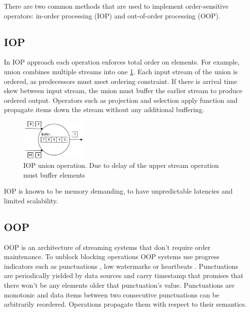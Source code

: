
\label {fs-typical}

There are two common methods that are used to implement order-sensitive operators: in-order processing (IOP) \cite{Arasu:2006:CCQ:1146461.1146463} \cite{Cranor:2003:GSD:872757.872838} \cite{hammad2004optimizing} and out-of-order processing (OOP)\cite{Li:2008:OPN:1453856.1453890}.

\subsection{IOP}

In IOP approach each operation enforces total order on elements. For example, union combines multiple streams into one \ref{iop}. Each input stream of the union is ordered, as predecessors must meet ordering constraint. If there is arrival time skew between input stream, the union must buffer the earlier stream to produce ordered output. Operators such as projection and selection apply function and propagate items down the stream without any additional buffering.

\begin{figure}[htbp]
  \centering
  \includegraphics[width=0.30\textwidth]{pics/iop}
  \caption{IOP union operation. Due to delay of the upper stream operation must buffer elements}
  \label {iop}
\end{figure}

IOP is known to be memory demanding, to have unpredictable latencies and limited scalability.\cite{Li:2008:OPN:1453856.1453890}

\subsection{OOP}

OOP is an architecture of streaming systems that don't require order maintenance. To unblock blocking operations OOP systems use progress indicators such as punctuations \cite{Tucker:2003:EPS:776752.776780}, low watermarks \cite{Akidau:2013:MFS:2536222.2536229} or heartbeats \cite{Srivastava:2004:FTM:1055558.1055596}. Punctuations are periodically yielded by data sources and carry timestamp that promises that there won't be any elements older that punctuation's value. Punctuations are monotonic and data items between two consecutive punctuations can be arbitrarily reordered. Operations propagate them with respect to their semantics.

